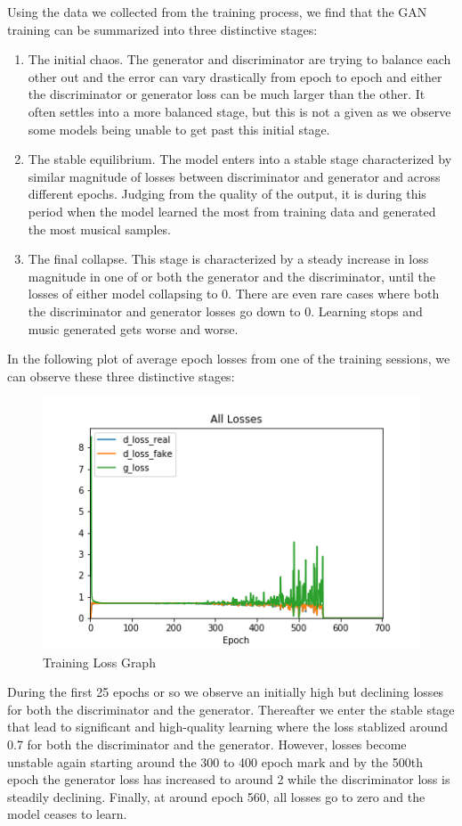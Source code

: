 \documentclass[12pt,oneside]{chicagocapstone}
\providecommand{\tightlist}{%
  \setlength{\itemsep}{0pt}\setlength{\parskip}{0pt}}
\begin{document}
Using the data we collected from the training process, we find that the GAN training can be summarized into three distinctive stages:
\begin{enumerate}
\def\labelenumi{\arabic{enumi}.}
\tightlist
\item
  The initial chaos. The generator and discriminator are trying to balance each other out and the error can vary drastically from epoch to epoch and either the discriminator or generator loss can be much larger than the other. It often settles into a more balanced stage, but this is not a given as we observe some models being unable to get past this initial stage.
\item
  The stable equilibrium. The model enters into a stable stage characterized by similar magnitude of losses between discriminator and generator and across different epochs. Judging from the quality of the output, it is during this period when the model learned the most from training data and generated the most musical samples.
\item
  The final collapse. This stage is characterized by a steady increase in loss magnitude in one of or both the generator and the discriminator, until the losses of either model collapsing to 0. There are even rare cases where both the discriminator and generator losses go down to 0. Learning stops and music generated gets worse and worse.
\end{enumerate}
In the following plot of average epoch losses from one of the training sessions, we can observe these three distinctive stages:
\begin{figure}

{\centering \includegraphics[width=0.3\linewidth]{figure/all_losses_1} 

}

\caption{Training Loss Graph}\label{fig:unnamed-chunk-3}
\end{figure}
During the first 25 epochs or so we observe an initially high but declining losses for both the discriminator and the generator. Thereafter we enter the stable stage that lead to significant and high-quality learning where the loss stablized around 0.7 for both the discriminator and the generator. However, losses become unstable again starting around the 300 to 400 epoch mark and by the 500th epoch the generator loss has increased to around 2 while the discriminator loss is steadily declining. Finally, at around epoch 560, all losses go to zero and the model ceases to learn.
\end{document}
